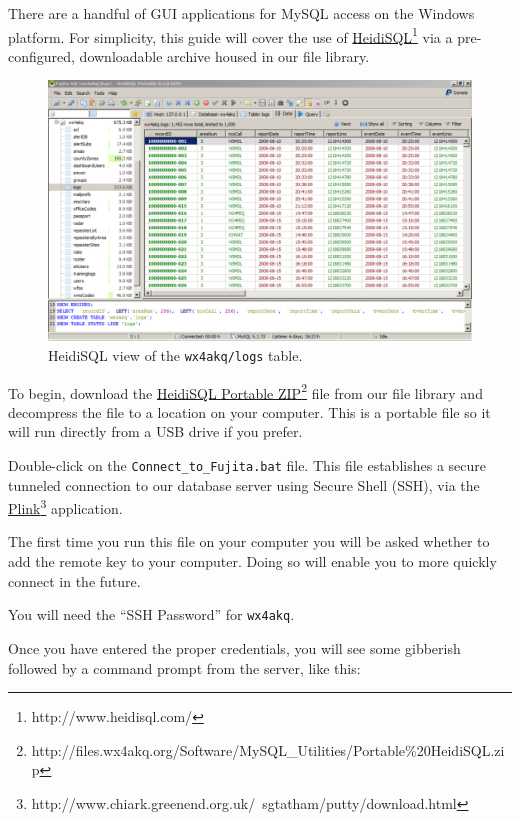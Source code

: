 \documentclass[pdflatex,letterpaper,twoside,12pt]{book}
\begin{document}
There are a handful of GUI applications for MySQL access on the Windows platform.  For simplicity, this guide will cover the use of \href{http://www.heidisql.com/}{HeidiSQL}\footnote{http://www.heidisql.com/} via a pre-configured, downloadable archive housed in our file library.

\begin{figure}[t]
  \centering
  \includegraphics[width=\textwidth,keepaspectratio=true]{img/heidisql}
  \caption{HeidiSQL view of the \texttt{wx4akq/logs} table.\label{fig:heidisql}}
\end{figure}


To begin, download the \href{http://files.wx4akq.org/Software/MySQL\_Utilities/Portable\%20HeidiSQL.zip}{HeidiSQL Portable ZIP}\footnote{http://files.wx4akq.org/Software/MySQL\_Utilities/Portable\%20HeidiSQL.zip} file from our file library and decompress the file to a location on your computer.  This is a portable file so it will run directly from a USB drive if you prefer.

Double-click on the \texttt{Connect\_to\_Fujita.bat} file.  This file establishes a secure tunneled connection to our database server using Secure Shell (SSH), via the \href{http://www.chiark.greenend.org.uk/~sgtatham/putty/download.html}{Plink}\footnote{http://www.chiark.greenend.org.uk/~sgtatham/putty/download.html} application.

The first time you run this file on your computer you will be asked whether to add the remote key to your computer.  Doing so will enable you to more quickly connect in the future.

You will need the ``SSH Password'' for \texttt{wx4akq}.

\pagebreak
Once you have entered the proper credentials, you will see some gibberish followed by a command prompt from the server, like this:
\end{document}

